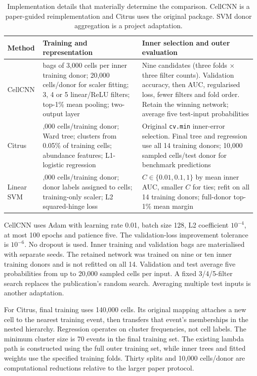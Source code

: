 \documentclass[11pt,a4paper]{article}
\begin{document}
\begin{table}[htb]\centering\small
\begin{tabular}{@{}>{\raggedright\arraybackslash}p{.15\linewidth}>{\raggedright\arraybackslash}p{.40\linewidth}>{\raggedright\arraybackslash}p{.37\linewidth}@{}}\toprule
Method & Training and representation & Inner selection and outer evaluation\\\midrule
CellCNN & 200 bags of 3,000 cells per inner training donor; 20,000 cells/donor for scaler fitting; 3, 4 or 5 linear/ReLU filters; top-1\% mean pooling; two-output layer & Nine candidates (three folds $\times$ three filter counts). Validation accuracy, then AUC, regularised loss, fewer filters and fold order. Retain the winning network; average five test-input probabilities\\
Citrus & 10,000 cells/training donor; Ward tree; clusters from 0.05\% of training cells; abundance features; L1-logistic regression & Original \texttt{cv.min} inner-error selection. Final tree and regression use all 14 training donors; 10,000 sampled cells/test donor for benchmark predictions\\
Linear SVM & 10,000 cells/training donor; donor labels assigned to cells; training-only scaler; L2 squared-hinge loss & $C\in\{0.01,0.1,1\}$ by mean inner AUC, smaller $C$ for ties; refit on all 14 training donors; full-donor top-1\% mean margin\\\bottomrule
\end{tabular}
\caption{Implementation details that materially determine the comparison. CellCNN is a paper-guided reimplementation and Citrus uses the original package. SVM donor aggregation is a project adaptation.}
\end{table}

CellCNN uses Adam with learning rate 0.01, batch size 128, L2 coefficient $10^{-4}$, at most 100 epochs and patience five. The validation-loss improvement tolerance is $10^{-6}$. No dropout is used. Inner training and validation bags are materialised with separate seeds. The retained network was trained on nine or ten inner training donors and is not refitted on all 14. Validation and test average five probabilities from up to 20,000 sampled cells per input. A fixed 3/4/5-filter search replaces the publication's random search. Averaging multiple test inputs is another adaptation.

For Citrus, final training uses 140,000 cells. Its original mapping attaches a new cell to the nearest training event, then transfers that event's memberships in the nested hierarchy. Regression operates on cluster frequencies, not cell labels. The minimum cluster size is 70 events in the final training set. The existing lambda path is constructed using the full outer training set, while inner trees and fitted weights use the specified training folds. Thirty splits and 10,000 cells/donor are computational reductions relative to the larger paper protocol.
\end{document}
